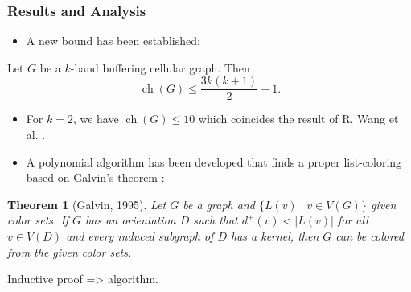 \documentclass{beamer} %
\newtheorem{theo}[lem]{Theorem}
\DeclareMathOperator{\ch}{ch}
\begin{document}
\begin{frame}[allowframebreaks]
\frametitle{Results and Analysis}
\justifying
\begin{itemize}
\item A new bound has been established:
\end{itemize}
\begin{theorem} Let $G$ be a $k$-band buffering cellular graph. Then 
$$\ch(G) \leqslant \frac{3k(k+1)}{2} + 1.$$
\end{theorem}
\begin{itemize}
\item For $k=2$, we have $\ch(G) \leqslant 10$ which coincides the result of R. Wang et al. \cite{7248845}.
\item A polynomial algorithm has been developed that finds a proper list-coloring based on Galvin's theorem \cite{Galvin:1995:LCI:199352.199369}:
\end{itemize}

\begin{theo}[Galvin, 1995]\label{thm:galvin} Let $G$ be a graph and $\lbrace L(v) \mid v \in V(G) \rbrace$ given color sets. If $G$ has an orientation $D$ such that $d^+(v) < |L(v)|$ for all $v \in V(D)$ and every induced subgraph of $D$ has a kernel, then $G$ can be colored from the given color sets.
\end{theo}
Inductive proof => algorithm.


\end{frame}
\end{document}
